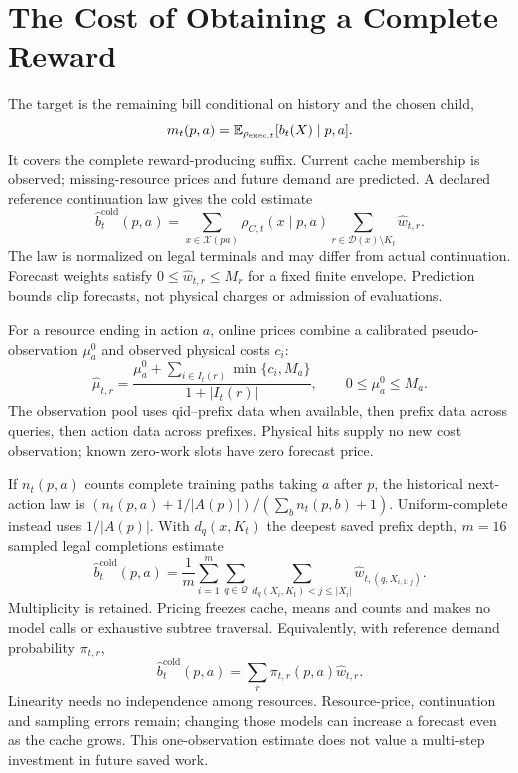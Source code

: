 \section{The Cost of Obtaining a Complete Reward}
\label{sec:estimation}
The target is the remaining bill conditional on history and the chosen child,
\begin{equation}
m_t(p,a)=\mathbb{E}_{\rho_{\mathrm{exec},t}}[b_t(X)\mid p,a].
\label{eq:actualmean}
\end{equation}
It covers the complete reward-producing suffix. Current cache membership is
observed; missing-resource prices and future demand are predicted. A declared
reference continuation law gives the cold estimate
\begin{equation}
\widehat b_t^{\mathrm{cold}}(p,a)=
\sum_{x\in\mathcal X(pa)}\rho_{C,t}(x\mid p,a)
\sum_{r\in\mathcal D(x)\setminus K_t}\widehat w_{t,r}.
\label{eq:reference}
\end{equation}
The law is normalized on legal terminals and may differ from actual
continuation. Forecast weights satisfy $0\le\widehat w_{t,r}\le M_r$ for
a fixed finite envelope. Prediction bounds clip forecasts, not physical
charges or admission of evaluations.

For a resource ending in action $a$, online prices combine a calibrated
pseudo-observation $\mu_a^0$ and observed physical costs $c_i$:
\begin{equation}
\widehat\mu_{t,r}=\frac{\mu_a^0+\sum_{i\in I_t(r)}\min\{c_i,M_a\}}
{1+|I_t(r)|},\qquad 0\le\mu_a^0\le M_a.
\label{eq:online-mean}
\end{equation}
The observation pool uses qid--prefix data when available, then prefix data
across queries, then action data across prefixes. Physical hits supply no
new cost observation; known zero-work slots have zero forecast price.

If $n_t(p,a)$ counts complete training paths taking $a$ after $p$, the
historical next-action law is
$(n_t(p,a)+1/|A(p)|)/(\sum_b n_t(p,b)+1)$.
Uniform-complete instead uses $1/|A(p)|$. With $d_q(x,K_t)$ the deepest
saved prefix depth, $m=16$ sampled legal completions estimate
\begin{equation}
\widehat b_t^{\mathrm{cold}}(p,a)=\frac1m\sum_{i=1}^m
\sum_{q\in\mathcal Q}\sum_{d_q(X_i,K_t)<j\le|X_i|}
\widehat w_{t,(q,X_{i,1:j})}.
\label{eq:sample-cost}
\end{equation}
Multiplicity is retained. Pricing freezes cache, means and counts and makes
no model calls or exhaustive subtree traversal. Equivalently, with reference
demand probability $\pi_{t,r}$,
\begin{equation}
\widehat b_t^{\mathrm{cold}}(p,a)=\sum_r\pi_{t,r}(p,a)\widehat w_{t,r}.
\label{eq:resourceform}
\end{equation}
Linearity needs no independence among resources. Resource-price, continuation
and sampling errors remain; changing those models can increase a forecast
even as the cache grows. This one-observation estimate does not value a
multi-step investment in future saved work.

